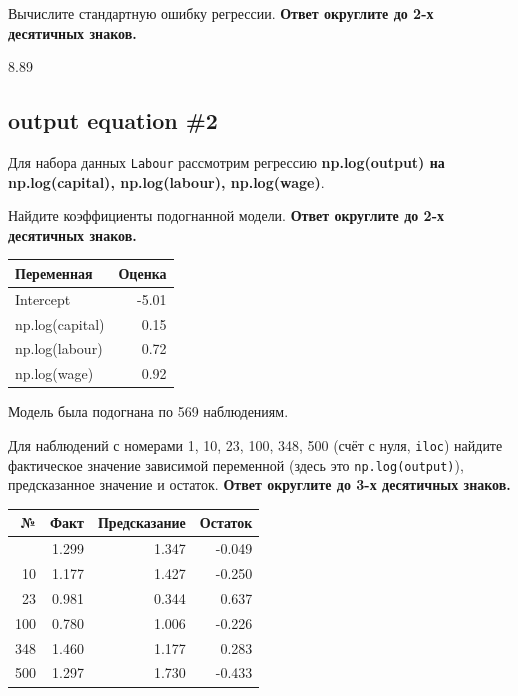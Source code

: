 \documentclass[
  russian,
]{article}
\newcounter{none} %
\begin{document}
Вычислите стандартную ошибку регрессии. \textbf{Ответ округлите до 2-х
десятичных знаков.}

\begin{tcolorbox}[enhanced jigsaw, arc=.35mm, bottomrule=.15mm, bottomtitle=1mm, breakable, colback=white, colbacktitle=quarto-callout-note-color!10!white, colframe=quarto-callout-note-color-frame, coltitle=black, left=2mm, leftrule=.75mm, opacityback=0, opacitybacktitle=0.6, rightrule=.15mm, title=\textcolor{quarto-callout-note-color}{\faInfo}\hspace{0.5em}{Стандартная ошибка регрессии}, titlerule=0mm, toprule=.15mm, toptitle=1mm]

8.89

\end{tcolorbox}

\subsection{output equation \#2}\label{output-equation-2}

Для набора данных \texttt{Labour} рассмотрим регрессию
\textbf{np.log(output) на np.log(capital), np.log(labour),
np.log(wage)}.

Найдите коэффициенты подогнанной модели. \textbf{Ответ округлите до 2-х
десятичных знаков.}

{\def\LTcaptype{none} %
\begin{longtable}[]{@{}lr@{}}
\toprule\noalign{}
Переменная & Оценка \\
\midrule\noalign{}
\endhead
\bottomrule\noalign{}
\endlastfoot
Intercept & -5.01 \\
np.log(capital) & 0.15 \\
np.log(labour) & 0.72 \\
np.log(wage) & 0.92 \\
\end{longtable}
}

Модель была подогнана по 569 наблюдениям.

Для наблюдений с номерами 1, 10, 23, 100, 348, 500 (счёт с нуля,
\texttt{iloc}) найдите фактическое значение зависимой переменной (здесь
это \texttt{np.log(output)}), предсказанное значение и остаток.
\textbf{Ответ округлите до 3-х десятичных знаков.}

{\def\LTcaptype{none} %
\begin{longtable}[]{@{}rrrr@{}}
\toprule\noalign{}
№ & Факт & Предсказание & Остаток \\
\midrule\noalign{}
\endhead
\bottomrule\noalign{}
\endlastfoot
1 & 1.299 & 1.347 & -0.049 \\
10 & 1.177 & 1.427 & -0.250 \\
23 & 0.981 & 0.344 & 0.637 \\
100 & 0.780 & 1.006 & -0.226 \\
348 & 1.460 & 1.177 & 0.283 \\
500 & 1.297 & 1.730 & -0.433 \\
\end{longtable}
}
\end{document}
